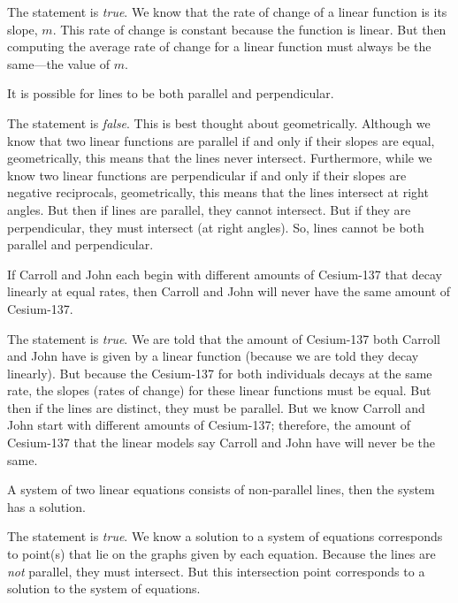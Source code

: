 \documentclass[11pt,letterpaper]{article}
\begin{document}
\sol The statement is \textit{true}. We know that the rate of change of a linear function is its slope, $m$. This rate of change is constant because the function is linear. But then computing the average rate of change for a linear function must always be the same---the value of $m$. \pvspace{1.3cm}



 It is possible for lines to be both parallel and perpendicular. \pspace

\sol The statement is \textit{false}. This is best thought about geometrically. Although we know that two linear functions are parallel if and only if their slopes are equal, geometrically, this means that the lines never intersect. Furthermore, while we know two linear functions are perpendicular if and only if their slopes are negative reciprocals, geometrically, this means that the lines intersect at right angles. But then if lines are parallel, they cannot intersect. But if they are perpendicular, they must intersect (at right angles). So, lines cannot be both parallel and perpendicular. \pvspace{1.3cm}



 If Carroll and John each begin with different amounts of Cesium-137 that decay linearly at equal rates, then Carroll and John will never have the same amount of Cesium-137. \pspace

\sol The statement is \textit{true}. We are told that the amount of Cesium-137 both Carroll and John have is given by a linear function (because we are told they decay linearly). But because the Cesium-137 for both individuals decays at the same rate, the slopes (rates of change) for these linear functions must be equal. But then if the lines are distinct, they must be parallel. But we know Carroll and John start with different amounts of Cesium-137; therefore, the amount of Cesium-137 that the linear models say Carroll and John have will never be the same. \pvspace{1.3cm}



 A system of two linear equations consists of non-parallel lines, then the system has a solution. \pspace

\sol The statement is \textit{true}. We know a solution to a system of equations corresponds to point(s) that lie on the graphs given by each equation. Because the lines are \textit{not} parallel, they must intersect. But this intersection point corresponds to a solution to the system of equations. \pvspace{1.3cm}



\end{document}
